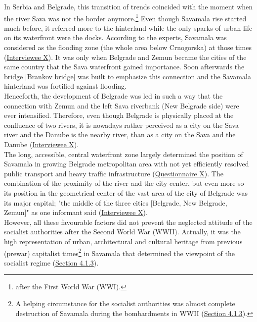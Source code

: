 \documentclass[11pt]{report}
\begin{document}
In Serbia and Belgrade, this transition of trends coincided with the moment when the river Sava was not the border anymore.\footnote{after the First World War (WWI).}
Even though Savamala rise started much before, it referred more to the hinterland while the only sparks of urban life on its waterfront were the docks.
According to the experts, Savamala was considered as the flooding zone (the whole area below Crnogorska) at those times (\href{InterviewX}{Interviewee X}).
It was only when Belgrade and Zemun became the cities of the same country that the Sava waterfront gained importance. Soon afterwards the bridge [Brankov bridge] was built to emphasize this connection and the Savamala hinterland was fortified against flooding.
\\

Henceforth, the development of Belgrade was led in such a way that the connection with Zemun and the left Sava riverbank (New Belgrade side) were ever intensified.
Therefore, even though Belgrade is physically placed at the confluence of two rivers, it is nowadays rather perceived as a city on the Sava river and the Danube is the nearby river, than as a city on the Sava and the Danube (\href{InterviewX}{Interviewee X}).
\\

The long, accessible, central waterfront zone largely determined the position of Savamala in growing Belgrade metropolitan area with not yet efficiently resolved public transport and heavy traffic infrastructure (\href{Questionnaire Experts Savamala}{Questionnaire X}).
The combination of the proximity of the river and the city center, but even more so its position in the geometrical center of the vast area of the city of Belgrade was its major capital; "the middle of the three cities [Belgrade, New Belgrade, Zemun]" as one informant said (\href{InterviewX}{Interviewee X}).
\\

However, all these favourable factors did not prevent the neglected attitude of the socialist authorities after the Second World War (WWII).
Actually, it was the high representation of urban, architectural and cultural heritage from previous (prewar) capitalist times\footnote{A helping circumstance for the socialist authorities was almost complete destruction of Savamala during the bombardments in WWII (\href{Section 4.1.3}{Section 4.1.3}).}
in Savamala that determined the viewpoint of the socialist regime (\href{Section 4.1.3}{Section 4.1.3}).
\\
\end{document}
